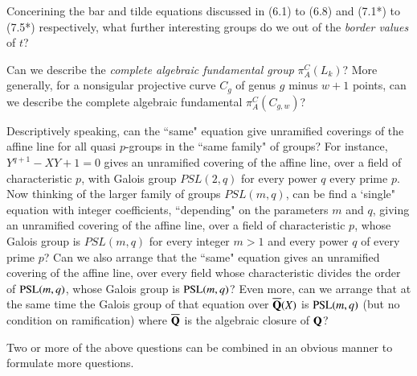 \begin{question}\label{art1-qus9.5}
Concerining the bar and tilde equations discussed in (6.1) to (6.8) and (7.1*) to (7.5*) respectively, what further interesting groups do we out of the \textit{border values} of $t$?
\end{question}

\begin{question}\label{art1-qus9.6}
Can we describe the \textit{complete algebraic fundamental group} $\pi^{C}_{A}(L_{k})$? More generally, for a nonsigular projective curve $C_{g}$ of genus $g$ minus $w+1$ points, can we describe the complete algebraic fundamental $\pi^{C}_{A}(C_{g,w})$?
\end{question}

\begin{question}\label{art1-qus9.7}
Descriptively speaking, can the ``same" equation give unramified coverings of the affine line for all quasi $p$-groups in the ``same family" of groups? For instance, $Y^{q+1}-XY+1 =0$ gives an unramified covering of the affine line, over a field of characteristic $p$, with Galois group $PSL(2,q)$ for every power $q$ every prime $p$. Now thinking of the larger family of groups $PSL(m,q)$, can be find a `single" equation with integer coefficients, ``depending" on the parameters $m$ and $q$, giving an unramified covering of the affine line, over a field of characteristic $p$, whose Galois group is $PSL(m,q)$ for every integer $m>1$ and every power $q$ of every prime $p$? Can we also arrange that the ``same" equation gives an unramified covering of the affine line, over every field whose characteristic divides the order of $\operatorname{PSL}(m,q)$, whose Galois group is $\operatorname{PSL}(m,q)$? Even more, can we arrange that at the same time the Galois group of that equation over $\overline{\mathbf{Q}}(X)$ is $\operatorname{PSL}(m,q)$ (but no condition on ramification) where $\overline{\mathbf{Q}}$ is the algebraic closure of $\mathbf{Q}$?
\end{question}

\setcounter{note}{7}
\begin{note}\label{art1-note9.8}
Two or more of the above questions can be combined in an obvious manner to formulate more questions.
\end{note}

